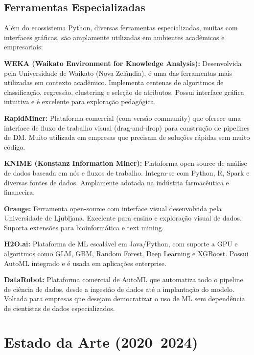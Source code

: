 \documentclass[12pt,a4paper]{article}
\begin{document}
\subsection{Ferramentas Especializadas}

Além do ecossistema Python, diversas ferramentas especializadas, muitas com interfaces gráficas, são amplamente utilizadas em ambientes acadêmicos e empresariais:

\textbf{WEKA (Waikato Environment for Knowledge Analysis):} Desenvolvida pela Universidade de Waikato (Nova Zelândia), é uma das ferramentas mais utilizadas em contexto acadêmico. Implementa centenas de algoritmos de classificação, regressão, clustering e seleção de atributos. Possui interface gráfica intuitiva e é excelente para exploração pedagógica.

\textbf{RapidMiner:} Plataforma comercial (com versão community) que oferece uma interface de fluxo de trabalho visual (drag-and-drop) para construção de pipelines de DM. Muito utilizada em empresas que precisam de soluções rápidas sem muito código.

\textbf{KNIME (Konstanz Information Miner):} Plataforma open-source de análise de dados baseada em nós e fluxos de trabalho. Integra-se com Python, R, Spark e diversas fontes de dados. Amplamente adotada na indústria farmacêutica e financeira.

\textbf{Orange:} Ferramenta open-source com interface visual desenvolvida pela Universidade de Ljubljana. Excelente para ensino e exploração visual de dados. Suporta extensões para bioinformática e text mining.

\textbf{H2O.ai:} Plataforma de ML escalável em Java/Python, com suporte a GPU e algoritmos como GLM, GBM, Random Forest, Deep Learning e XGBoost. Possui AutoML integrado e é usada em aplicações enterprise.

\textbf{DataRobot:} Plataforma comercial de AutoML que automatiza todo o pipeline de ciência de dados, desde a ingestão de dados até a implantação do modelo. Voltada para empresas que desejam democratizar o uso de ML sem dependência de cientistas de dados especializados.

\section{Estado da Arte (2020--2024)}
\end{document}

